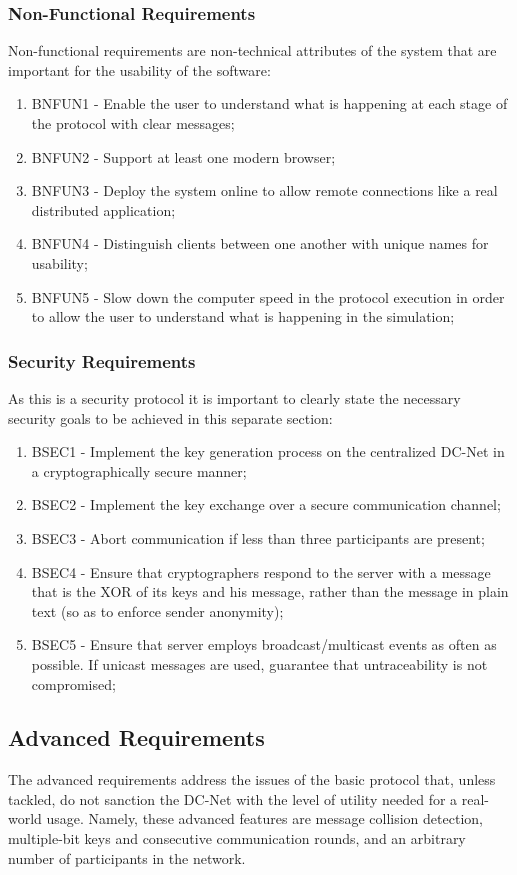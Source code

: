 \subsubsection{Non-Functional Requirements}
Non-functional requirements are non-technical attributes of the system that are important for the usability of the software: 
\begin{enumerate}
    \item BNFUN1 - Enable the user to understand what is happening at each stage of the protocol with clear messages;
    \item BNFUN2 - Support at least one modern browser;
    \item BNFUN3 - Deploy the system online to allow remote connections like a real distributed application;
    \item BNFUN4 - Distinguish clients between one another with unique names for usability;
    \item BNFUN5 - Slow down the computer speed in the protocol execution in order to allow the user to understand what is happening in the simulation;
\end{enumerate}

\subsubsection{Security Requirements}
As this is a security protocol it is important to clearly state the necessary security goals to be achieved in this separate section:
\begin{enumerate}
    \item BSEC1 - Implement the key generation process on the centralized DC-Net in a cryptographically secure manner;
    \item BSEC2 - Implement the key exchange over a secure communication channel;
    \item BSEC3 - Abort communication if less than three participants are present;
    \item BSEC4 - Ensure that cryptographers respond to the server with a message that is the XOR of its keys and his message, rather than the message in plain text (so as to enforce sender anonymity);
    \item BSEC5 - Ensure that server employs broadcast/multicast events as often as possible. If unicast messages are used, guarantee that untraceability is not compromised;
\end{enumerate}

\subsection{Advanced Requirements}
The advanced requirements address the issues of the basic protocol that, unless tackled, do not sanction the DC-Net with the level of utility needed for a real-world usage. Namely, these advanced features are message collision detection, multiple-bit keys and consecutive communication rounds, and an arbitrary number of participants in the network.


